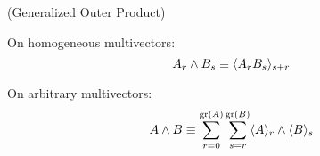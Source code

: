 \begin{definition}
	(Generalized Outer Product)

	On homogeneous multivectors:
	\[A_r \wedge B_s \equiv \langle A_rB_s \rangle_{s+r}\]
	
	On arbitrary multivectors:
	\[A \wedge B \equiv \sum_{r=0}^{\mathrm{gr}\left(A\right)}\sum_{s=r}^{\mathrm{gr}\left(B\right)} \langle A \rangle_{r} \wedge \langle B \rangle_{s}\]
\end{definition}
